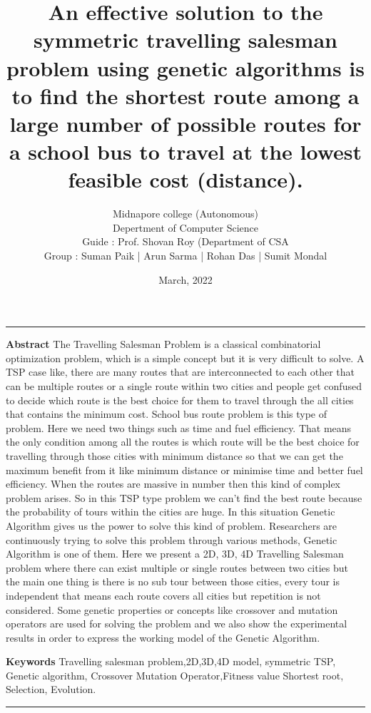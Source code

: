 \documentclass{article}
\title{An effective solution to the symmetric travelling salesman problem using genetic algorithms is to find the shortest route among a large number of possible routes for a school bus to travel at the lowest feasible cost (distance).}
\date{March, 2022}
\author{ Midnapore college (Autonomous) \\ Depertment of Computer Science \\ Guide : Prof. Shovan Roy (Department of CSA \\ Group : Suman Paik | Arun Sarma | Rohan Das | Sumit Mondal
}
\begin{document}
\maketitle
\noindent
\rule{\textwidth}{0.5pt}

\vspace{0.1cm}\textbf{Abstract  } The Travelling Salesman Problem is a classical combinatorial optimization problem, which is a simple concept but it is very difficult to solve. A TSP case like, there are many routes that are interconnected to each other that can be multiple routes or a single route within two cities and people get confused to decide which route is the best choice for them to travel through the all cities that contains the minimum cost. School bus route problem is this type of problem. Here we need two things such as time and fuel efficiency. That means the only condition among all the routes is which route will be the best choice for travelling through those cities with minimum distance so that we can get the maximum benefit from it like minimum distance or minimise time and better fuel efficiency. When the routes are massive in number then this kind of complex problem arises. So in this TSP type problem we can't find the best route because the probability of tours within the cities are huge. In this situation Genetic Algorithm gives us the power to solve this kind of problem. Researchers  are continuously trying to solve this problem through various methods, Genetic Algorithm is one of them. Here we present a 2D, 3D, 4D Travelling Salesman problem where there can exist multiple or single routes between two cities but the main one thing is there is no sub tour between those cities, every tour is independent that means each route covers all cities but repetition is not considered. Some genetic properties or concepts like crossover and mutation operators are used for solving the problem and we also show the experimental results in order to express the working model of the Genetic Algorithm.



\vspace{0.2cm}\textbf{Keywords  } Travelling salesman problem,2D,3D,4D model, symmetric TSP, Genetic algorithm, Crossover Mutation Operator,Fitness value Shortest root, Selection, Evolution.
\par\noindent\rule{\textwidth}{0.5pt}
\end{document}
